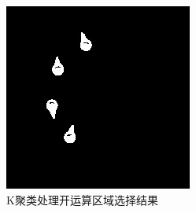 \documentclass[a4paper]{ctexart}
\begin{document}
\begin{enumerate}[label=\arabic*、]
\begin{enumerate}[label=\alph*)]
\begin{figure}[htbp]
\begin{minipage}[t]{0.25\textwidth}
				\includegraphics[width=\textwidth]{figure/drop_2/img5.jpg}
			\end{minipage}
			\caption{K聚类处理开运算区域选择结果}\label{fig:K聚类开运算区域选择}
		\end{figure}
	\end{enumerate}
	

\end{enumerate}
\end{document}
